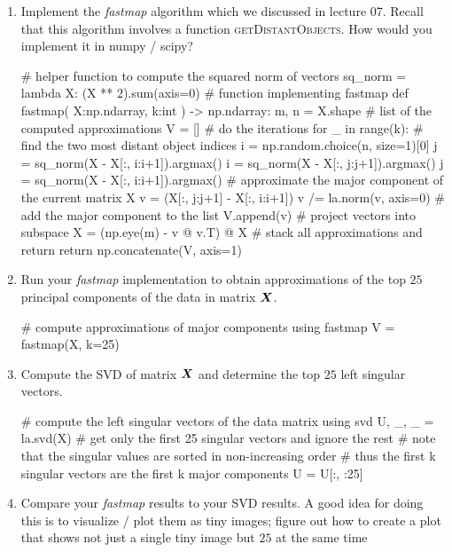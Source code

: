 \begin{enumerate}
\item Implement the \emph{fastmap} algorithm which we discussed in lecture 07. Recall that this algorithm involves a function \textsc{getDistantObjects}. How would you implement it in numpy / scipy?
\begin{python}
# helper function to compute the squared norm of vectors
sq_norm = lambda X: (X ** 2).sum(axis=0)
# function implementing fastmap
def fastmap(
    X:np.ndarray, 
    k:int
) -> np.ndarray:
    m, n = X.shape
    # list of the computed approximations
    V = []
    # do the iterations
    for _ in range(k):
        # find the two most distant object indices
        i = np.random.choice(n, size=1)[0]
        j = sq_norm(X - X[:, i:i+1]).argmax()
        i = sq_norm(X - X[:, j:j+1]).argmax()
        j = sq_norm(X - X[:, i:i+1]).argmax()
        # approximate the major component of the current matrix X
        v = (X[:, j:j+1] - X[:, i:i+1])
        v /= la.norm(v, axis=0)
        # add the major component to the list
        V.append(v)
        # project vectors into subspace
        X = (np.eye(m) - v @ v.T) @ X
    # stack all approximations and return
    return np.concatenate(V, axis=1)
\end{python}

\item Run your \emph{fastmap} implementation to obtain approximations of the top $25$ principal components of the data in matrix $\bm{X}$. 
\begin{python}
# compute approximations of major components using fastmap
V = fastmap(X, k=25)
\end{python}

\item  Compute the SVD of matrix $\bm{X}$ and determine the top $25$ left singular vectors.
\begin{python}
# compute the left singular vectors of the data matrix using svd
U, _, _ = la.svd(X)
# get only the first 25 singular vectors and ignore the rest
# note that the singular values are sorted in non-increasing order
# thus the first k singular vectors are the first k major components
U = U[:, :25]
\end{python}

\item Compare your \emph{fastmap} results to your SVD results. A good idea for doing this is to visualize / plot them as tiny images; figure out how to create a plot that shows not just a single tiny image but $25$ at the same time


\end{enumerate}
